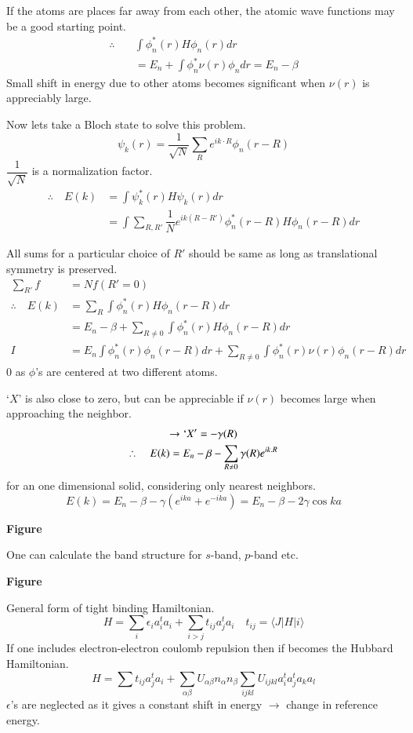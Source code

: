 If the atoms are places far away from each other, the atomic wave functions may be a good starting point.
\begin{align*}
\therefore\quad & \int \phi^{*}_{n}(r)H\phi_{n}(r)dr\\
& =E_{n}+\int\phi^{*}_{n}\nu(r)\phi_{n}dr=E_{n}-\beta
\end{align*}
Small shift in energy due to other atoms becomes significant when $\nu(r)$ is appreciably large.

Now lets take a Bloch state to solve this problem.
$$
\psi_{k}(r)=\dfrac{1}{\sqrt{N}}\sum\limits_{R}e^{ik\cdot R}\phi_{n}(r-R)
$$
$\dfrac{1}{\sqrt{N}}$ is a normalization factor.
\begin{align*}
\therefore\quad E(k) &= \int \psi^{*}_{k}(r)H\psi_{k}(r)dr\\
&= \int \sum\limits_{R,R'}\dfrac{1}{N}e^{ik(R-R')}\phi^{*}_{n}(r-R)H\phi_{n}(r-R)dr
\end{align*}

All sums for a particular choice of $R'$ should be same as long as translational symmetry is preserved.
\begin{align*}
\sum\limits_{R'}f &= Nf(R'=0)\\
\therefore\quad E(k) &= \sum\limits_{R}\int \phi^{*}_{n}(r)H\phi_{n}(r-R)dr\\
&= E_{n}-\beta+\sum\limits_{R\neq 0}\int \phi^{*}_{n}(r)H\phi_{n}(r-R) dr\\
I &= E_{n}\int\phi^{*}_{n}(r)\phi_{n}(r-R)dr+\sum\limits_{R\neq 0}\int \phi^{*}_{n}(r)\nu(r)\phi_{n}(r-R)dr
\end{align*}
$0$ as $\phi$'s are centered at two different atoms.

`$X$' is also close to zero, but can be appreciable if $\nu(r)$ becomes large when approaching the neighbor.
\begin{gather*}
\to `X' = -\gamma(R)\\
\therefore\quad E(k)=E_{n}-\beta-\sum\limits_{R\neq 0}\gamma(R)e^{ik.R}
\end{gather*}
for an one dimensional solid, considering only nearest neighbors.
$$
E(k)=E_{n}-\beta-\gamma(e^{ika}+e^{-ika})=E_{n}-\beta-2\gamma \cos ka
$$
\begin{center}
{\bf Figure}
\end{center}
One can calculate the band structure for $s$-band, $p$-band etc.
\begin{center}
{\bf Figure}
\end{center}
General form of tight binding Hamiltonian.
$$
H=\sum\limits_{i}\epsilon_{i}a_{i}^{t}a_{i}+\sum\limits_{i>j}t_{ij}a_{j}^{t}a_{i}\quad t_{ij}=\langle J |H|i\rangle
$$
If one includes electron-electron coulomb repulsion then if becomes the Hubbard Hamiltonian.
$$
H=\sum t_{ij}a^{t}_{j}a_{i}+\sum_{\alpha\beta}U_{\alpha\beta}n_{\alpha}n_{\beta}\sum_{ijkl}U_{ijkl}a_{i}^{t}a^{t}_{j}a_{k}a_{l}
$$
$\epsilon$'s are neglected as it gives a constant shift in energy $\to$ change in reference energy.

